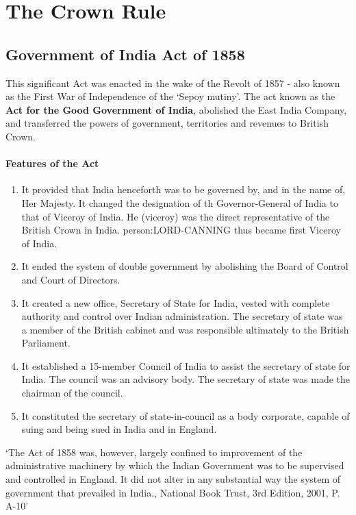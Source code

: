 \section{The Crown Rule}

\subsection{Government of India Act of 1858}

This significant Act was enacted in the wake of the Revolt of 1857 - also known as the First War of Independence of the `Sepoy mutiny'. The act known as the \textbf{Act for the Good Government of India}, abolished the East India Company, and transferred the powers of government, territories and revenues to British Crown.

\paragraph{Features of the Act}
\begin{enumerate}
  \item It provided that India henceforth was to be governed by, and in the name of, Her Majesty. It changed the designation of th Governor-General of India to that of Viceroy of India. He (viceroy) was the direct representative of the British Crown in India. \gls{person:LORD-CANNING} thus became first Viceroy of India.
  \item It ended the system of double government by abolishing the Board of Control and Court of Directors.
  \item It created a new office, Secretary of State for India, vested with complete authority and control over Indian administration. The secretary of state was a member of the British cabinet and was responsible ultimately to the British Parliament.
  \item It established a 15-member Council of India to assist the secretary of state for India. The council was an advisory body. The secretary of state was made the chairman of the council.
  \item It constituted the secretary of state-in-council as a body corporate, capable of suing and being sued in India and in England.
\end{enumerate}

`The Act of 1858 was, however, largely confined to improvement of the administrative machinery by which the Indian Government was to be supervised and controlled in England. It did not alter in any substantial way the system of government that prevailed in India., National Book Trust, 3rd Edition, 2001, P. A-10'


